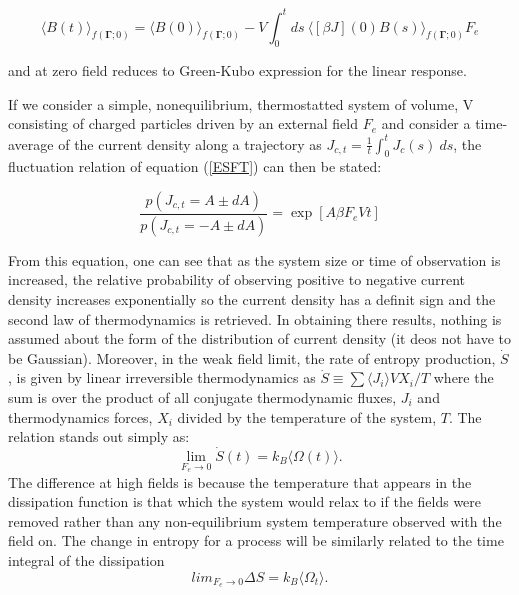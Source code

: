 \documentclass[a4paper,12pt]{article}
\begin{document}
\begin{equation}
  \langle B(t) \rangle_{f(\bm{\Gamma};0)}=\langle B(0) \rangle_{f(\bm{\Gamma};0)} - V \int_0^t ds\ \langle[\beta J](0)B(s)\rangle_{f(\bm{\Gamma};0)} F_e
\end{equation}

and at zero field reduces to Green-Kubo expression for the linear response.


If we consider a simple, nonequilibrium, thermostatted system of volume, V consisting of charged particles driven by an external field $F_e$ and consider a time-average of the current density along a trajectory as $J_{c,t}= \frac{1}{t}\int_0^t J_c(s)\ ds$, the fluctuation relation of equation (\ref{ESFT}) can then be stated:

\begin{equation}
  \frac{p(J_{c,t}=A\pm dA)}{p(J_{c,t}=-A\pm dA)}= \exp[A \beta F_e V t]
\end{equation}

From this equation, one can see that as the system size or time of observation is increased, the relative probability of observing positive to negative current density increases exponentially so the current density has a definit sign and the second law of thermodynamics is retrieved. In obtaining there results, nothing is assumed about the form of the distribution of current density (it deos not have to be Gaussian). Moreover, in the weak field limit, the rate of entropy production, $\dot{S}$, is given by linear irreversible thermodynamics as $\dot{S} \equiv \sum \langle J_i \rangle V X_i/T$ where the sum is over the product of all conjugate thermodynamic fluxes, $J_i$ and thermodynamics forces, $X_i$ divided by the temperature of the system, $T$. The relation stands out simply as:
\begin{equation}
  \lim_{F_e \to 0} \dot{S}(t) = k_B \langle \Omega(t) \rangle.
\end{equation}
The difference at high fields is because the temperature that appears in the dissipation function is that which the system would relax to if the fields were removed rather than any non-equilibrium system temperature observed with the field on. The change in entropy for a process will be similarly related to the time integral of the dissipation
\begin{equation}
  lim_{F_e \to 0} \Delta S= k_B \langle \Omega_t \rangle.
\end{equation}
\end{document}

